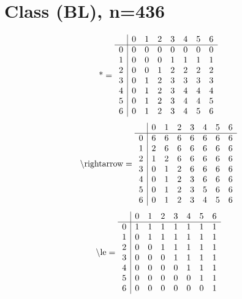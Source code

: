 \documentclass[11pt]{article}
\begin{document}
\section{Class (BL), n=436}
\[\text{*} = 
\begin{array}{r | r r r r r r r}
 & 0 & 1 & 2 & 3 & 4 & 5 & 6 \\ \hline
0 & 0 & 0 & 0 & 0 & 0 & 0 & 0 \\
1 & 0 & 0 & 0 & 1 & 1 & 1 & 1 \\
2 & 0 & 0 & 1 & 2 & 2 & 2 & 2 \\
3 & 0 & 1 & 2 & 3 & 3 & 3 & 3 \\
4 & 0 & 1 & 2 & 3 & 4 & 4 & 4 \\
5 & 0 & 1 & 2 & 3 & 4 & 4 & 5 \\
6 & 0 & 1 & 2 & 3 & 4 & 5 & 6 \\
\end{array}
\]
\[\text{\textbackslash rightarrow} = 
\begin{array}{r | r r r r r r r}
 & 0 & 1 & 2 & 3 & 4 & 5 & 6 \\ \hline
0 & 6 & 6 & 6 & 6 & 6 & 6 & 6 \\
1 & 2 & 6 & 6 & 6 & 6 & 6 & 6 \\
2 & 1 & 2 & 6 & 6 & 6 & 6 & 6 \\
3 & 0 & 1 & 2 & 6 & 6 & 6 & 6 \\
4 & 0 & 1 & 2 & 3 & 6 & 6 & 6 \\
5 & 0 & 1 & 2 & 3 & 5 & 6 & 6 \\
6 & 0 & 1 & 2 & 3 & 4 & 5 & 6 \\
\end{array}
\]
\[\text{\textbackslash le} = 
\begin{array}{r | r r r r r r r}
 & 0 & 1 & 2 & 3 & 4 & 5 & 6 \\ \hline
0 & 1 & 1 & 1 & 1 & 1 & 1 & 1 \\
1 & 0 & 1 & 1 & 1 & 1 & 1 & 1 \\
2 & 0 & 0 & 1 & 1 & 1 & 1 & 1 \\
3 & 0 & 0 & 0 & 1 & 1 & 1 & 1 \\
4 & 0 & 0 & 0 & 0 & 1 & 1 & 1 \\
5 & 0 & 0 & 0 & 0 & 0 & 1 & 1 \\
6 & 0 & 0 & 0 & 0 & 0 & 0 & 1 \\
\end{array}
\]
\end{document}
